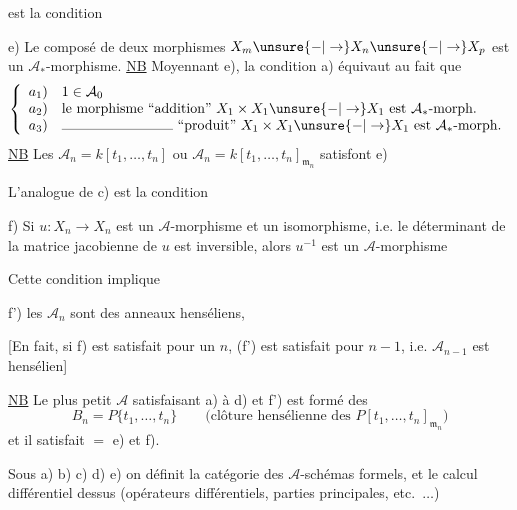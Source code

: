 est la condition

e) Le composé de deux morphismes $X_m\unsure{-|\to}X_n\unsure{-|\to}X_p$ est un $\mathcal A_*$-morphisme.
\uline{NB} Moyennant  e), la condition a) équivaut au fait que
\[
\left\{\begin{array}{ll}
a_1)&1\in\mathcal A_0\\
a_2)&\text{le morphisme ``addition'' }X_1\times X_1\unsure{-|\to}X_1\text{ est }\mathcal A_*\text{-morph.}\\
a_3)&\rule{2.8cm}{0.3pt}\text{ ``produit'' }X_1\times X_1\unsure{-|\to}X_1\text{ est }\mathcal A_*\text{-morph.}
\end{array}\right.
\]
\uline{NB} Les $\mathcal A_n=k[t_1,\ldots,t_n]$ ou $\mathcal A_n=k[t_1,\ldots,t_n]_{\mathfrak m_n}$ satisfont e)

L'analogue de c) est la condition

f) Si $u:X_n\longrightarrow X_n$ est un $\mathcal A$-morphisme et un isomorphisme,  i.e. le déterminant  de la matrice jacobienne de $u$ est inversible, alors $u^{-1}$ est un $\mathcal A$-morphisme

Cette condition implique 

f') les $\mathcal A_n$ sont des anneaux henséliens,

[En fait, si f) est satisfait pour un $n$, (f') est satisfait pour $n-1$, i.e. $\mathcal A_{n-1}$ est hensélien]

\uline{NB} Le plus petit $\mathcal A$ satisfaisant a) à d) et f') est formé des
\[
B_n=P\{t_1,\ldots,t_n\}\qquad\text{(clôture hensélienne des }P[t_1,\ldots,t_n]_{\mathfrak m_n}\text{)}
\]
et il satisfait $=$ e) et f).


Sous a) b) c) d) e) on définit la catégorie des $\mathcal A$-schémas formels, et le calcul différentiel dessus (opérateurs différentiels, parties principales, etc.\ $\ldots$)
